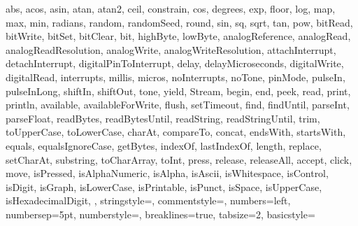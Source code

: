 {{  							abs, acos, asin, atan, atan2, ceil, constrain, cos, degrees, exp, 
  							floor, log, map, max, min, radians, random, randomSeed, round, sin, 
  							sq, sqrt, tan, pow, bitRead, bitWrite, bitSet, bitClear, bit, 
  							highByte, lowByte, analogReference, analogRead, 
  							analogReadResolution, analogWrite, analogWriteResolution, 
  							attachInterrupt, detachInterrupt, digitalPinToInterrupt, delay, 
  							delayMicroseconds, digitalWrite, digitalRead, interrupts, millis, 
  							micros, noInterrupts, noTone, pinMode, pulseIn, pulseInLong, shiftIn, 
  							shiftOut, tone, yield, Stream, begin, end, peek, read, print, 
  							println, available, availableForWrite, flush, setTimeout, find, 
  							findUntil, parseInt, parseFloat, readBytes, readBytesUntil, readString, 
  							readStringUntil, trim, toUpperCase, toLowerCase, charAt, compareTo, 
  							concat, endsWith, startsWith, equals, equalsIgnoreCase, getBytes, 
  							indexOf, lastIndexOf, length, replace, setCharAt, substring, 
  							toCharArray, toInt, press, release, releaseAll, accept, click, move, 
  							isPressed, isAlphaNumeric, isAlpha, isAscii, isWhitespace, isControl, 
  							isDigit, isGraph, isLowerCase, isPrintable, isPunct, isSpace, 
  							isUpperCase, isHexadecimalDigit, 
  							},			
%
%
  stringstyle=\color{arduinoDarkBlue},    
  commentstyle=\color{arduinoGrey},    
%          
%   
 	numbers=left,                    
  numbersep=5pt,                   
  numberstyle=\color{arduinoGrey},    
%
%
  breaklines=true,                    %
  tabsize=2,         
  basicstyle=\ttfamily  
}